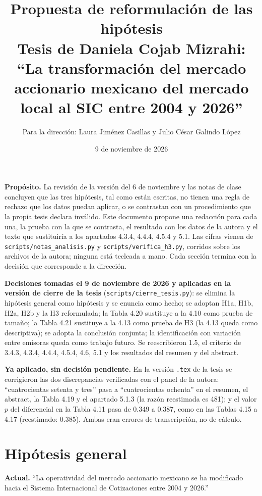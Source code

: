 \documentclass[11pt,letterpaper]{article}
\title{Propuesta de reformulación de las hipótesis\\[2pt]
\large Tesis de Daniela Cojab Mizrahi: ``La transformación del mercado accionario mexicano del mercado local al SIC entre 2004 y 2026''}
\author{Para la dirección: Laura Jiménez Casillas y Julio César Galindo López}
\date{9 de noviembre de 2026}
\begin{document}
\maketitle

\textbf{Propósito.} La revisión de la versión del 6 de noviembre y las notas de clase concluyen que las tres hipótesis, tal como están escritas, no tienen una regla de rechazo que los datos puedan aplicar, o se contrastan con un procedimiento que la propia tesis declara inválido. Este documento propone una redacción para cada una, la prueba con la que se contrasta, el resultado con los datos de la autora y el texto que sustituiría a los apartados 4.3.4, 4.4.4, 4.5.4 y 5.1. Las cifras vienen de \texttt{scripts/notas\_analisis.py} y \texttt{scripts/verifica\_h3.py}, corridos sobre los archivos de la autora; ninguna está tecleada a mano. Cada sección termina con la decisión que corresponde a la dirección.

\begin{tcolorbox}[colback=green!5,colframe=green!45!black,boxrule=0.5pt,arc=1pt]\small
\textbf{Decisiones tomadas el 9 de noviembre de 2026 y aplicadas en la versión de cierre de la tesis} (\texttt{scripts/cierre\_tesis.py}): se elimina la hipótesis general como hipótesis y se enuncia como hecho; se adoptan H1a, H1b, H2a, H2b y la H3 reformulada; la Tabla 4.20 sustituye a la 4.10 como prueba de tamaño; la Tabla 4.21 sustituye a la 4.13 como prueba de H3 (la 4.13 queda como descriptiva); se adopta la conclusión conjunta; la identificación con variación entre emisoras queda como trabajo futuro. Se reescribieron 1.5, el criterio de 3.4.3, 4.3.4, 4.4.4, 4.5.4, 4.6, 5.1 y los resultados del resumen y del abstract.
\end{tcolorbox}

\textbf{Ya aplicado, sin decisión pendiente.} En la versión \texttt{.tex} de la tesis se corrigieron las dos discrepancias verificadas con el panel de la autora: ``cuatrocientas setenta y tres'' pasa a ``cuatrocientas ochenta'' en el resumen, el abstract, la Tabla 4.19 y el apartado 5.1.3 (la razón reestimada es 481); y el valor $p$ del diferencial en la Tabla 4.11 pasa de 0.349 a 0.387, como en las Tablas 4.15 a 4.17 (reestimado: 0.385). Ambas eran errores de transcripción, no de cálculo.

\section{Hipótesis general}
\textbf{Actual.} ``La operatividad del mercado accionario mexicano se ha modificado hacia el Sistema Internacional de Cotizaciones entre 2004 y 2026.''
\end{document}
